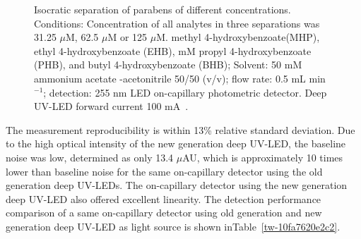 \documentclass[11pt]{article}
\makeatletter
\def\fixFloatSize#1{}%
\makeatother
\begin{document}
\bgroup
\fixFloatSize{images/3af05996-142a-4ae0-987e-11cce33c727b-uisocraticseparationofparabensofdifferentconcentrations.png}
\begin{figure}[!htbp]
\centering \makeatletter{}
\makeatother 
\caption{{Isocratic separation of parabens of different concentrations. Conditions: Concentration of all analytes in three separations was 31.25 \ensuremath{\mu}M, 62.5 \ensuremath{\mu}M or 125 \ensuremath{\mu}M. methyl 4-hydroxybenzoate(MHP), ethyl 4-hydroxybenzoate (EHB), mM propyl 4-hydroxybenzoate (PHB), and butyl 4-hydroxybenzoate (BHB); Solvent: 50 mM ammonium acetate -acetonitrile 50/50 (v/v); flow rate: 0.5 mL min\ensuremath{^{-1}}; detection: 255 nm LED on-capillary photometric detector. Deep UV-LED forward current 100 mA\unskip~\protect\cite{693772:16459460}.}}
\label{f-69d087c4c664}
\end{figure}
\egroup
The measurement reproducibility is within 1{\textendash}3\% relative standard deviation. Due to the high optical intensity of the new generation deep UV-LED, the baseline noise was low, determined as only 13.4 \ensuremath{\mu}AU, which is approximately 10 times lower than baseline noise for the same on-capillary detector using the old generation deep UV-LEDs. The on-capillary detector using the new generation deep UV-LED also offered excellent linearity. The detection performance comparison of a same on-capillary detector using old generation and new generation deep UV-LED as light source is shown inTable~\ref{tw-10fa7620e2c2}.
\end{document}
